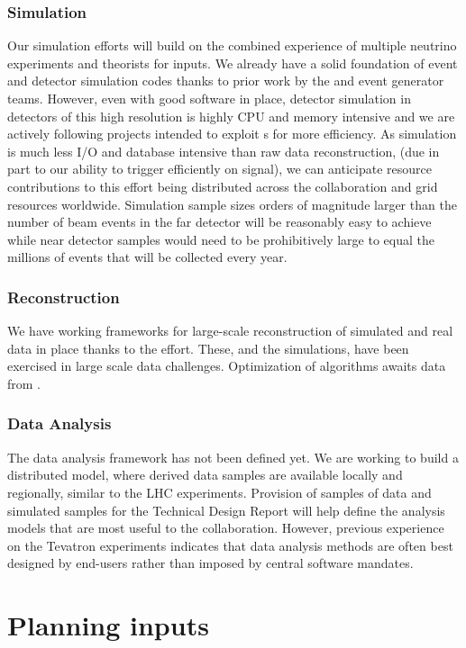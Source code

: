 \subsubsection{Simulation}  Our simulation efforts will build on the combined experience of multiple neutrino experiments and theorists for inputs.  We already have a solid foundation of event and detector simulation codes thanks to prior work by the  and event generator teams.  However,   even with good software in place, detector simulation in detectors of this high resolution is highly CPU and memory intensive and we are actively following projects intended to exploit s for more efficiency.  As simulation is much less I/O and database intensive than raw data reconstruction, (due in part to our ability to trigger efficiently on signal), we can anticipate resource contributions to this effort being distributed across the collaboration and grid resources worldwide. Simulation sample sizes orders of magnitude larger than the number of beam events  in the  far detector will be reasonably easy to achieve while near detector samples would need to be prohibitively large to equal the millions of events that will be collected every year. 

\subsubsection{Reconstruction} We have working frameworks for large-scale reconstruction of simulated and real data in place thanks to the  effort.  These, and the simulations, have been exercised in large scale data challenges. Optimization of algorithms awaits data from . 
 
 \subsubsection{Data Analysis}
 The  data analysis framework has not been defined yet.  We are working to build a distributed model, where derived data samples are available locally and regionally, similar to the LHC experiments.   Provision of samples  of  data and simulated samples for the Technical Design Report will help define the analysis models that are most useful to the collaboration. However,  previous experience on the Tevatron experiments indicates that data analysis methods are often best designed by end-users rather than imposed by central software mandates. 
 
 
\section{Planning inputs}



